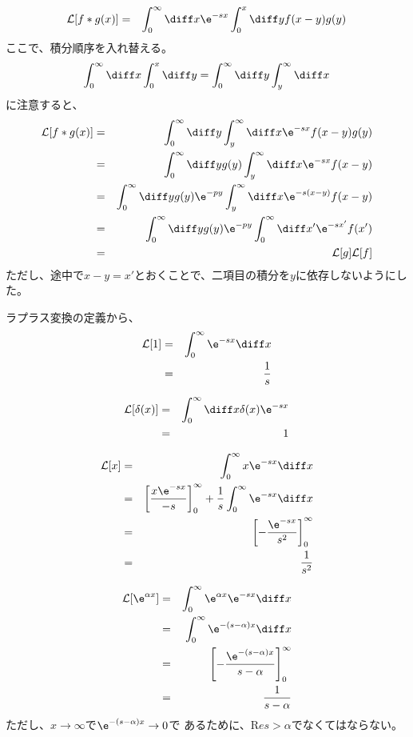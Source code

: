 \begin{eqnarray}
  {\cal L}[f*g(x)] &=&  \int_{0}^{\infty} \diff x \e^{-sx} \int_{0}^{x} \diff y f(x-y)g(y)
\end{eqnarray}
ここで、積分順序を入れ替える。
\begin{equation}
  \int_0^{\infty} \diff x \int_0^{x} \diff y = \int_0^{\infty} \diff y \int_y^{\infty} \diff x
\end{equation}
に注意すると、
\begin{eqnarray}
  {\cal L}[f*g(x)] &=&  \int_0^{\infty} \diff y \int_y^{\infty} \diff x  \e^{-sx} f(x-y)g(y) \\
  &=& \int_0^{\infty} \diff y g(y) \int_y^{\infty} \diff x  \e^{-sx} f(x-y) \\
  &=& \int_0^{\infty} \diff y g(y) \e^{-py} \int_y^{\infty} \diff x  \e^{-s(x-y)} f(x-y) \\
  &=& \int_0^{\infty} \diff y g(y) \e^{-py} \int_0^{\infty} \diff x'  \e^{-sx'} f(x') \\
  &=& {\cal L}[g] {\cal L}[f]
\end{eqnarray}
ただし、途中で$x-y = x'$とおくことで、二項目の積分を$y$に依存しないようにした。


ラプラス変換の定義から、
\begin{eqnarray}
  {\cal L}[1] &=& \int_0^{\infty} \e^{-sx} \diff x\\
  &=& \frac{1}{s}
\end{eqnarray}

\begin{eqnarray}
  {\cal L}[\delta(x)] &=& \int_0^{\infty} \diff x \delta(x) \e^{-sx}\\
  &=& 1
\end{eqnarray}

\begin{eqnarray}
  {\cal L}[x] &=& \int_0^{\infty}  x \e^{-sx} \diff x\\
  &=& \left[ \frac{x \e^{-sx}}{-s} \right]_0^{\infty} + \frac{1}{s} \int_0^{\infty} \e^{-sx} \diff x\\
  &=& \left[ -\frac{\e^{-sx}}{s^2} \right]_0^{\infty} \\
  &=& \frac{1}{s^2}
\end{eqnarray}

\begin{eqnarray}
  {\cal L}[\e^{\alpha x}] &=& \int_0^{\infty}  \e^{\alpha x} \e^{-sx} \diff x\\
  &=& \int_0^{\infty}  \e^{-(s-\alpha)x} \diff x\\
  &=& \left[ - \frac{\e^{-(s-\alpha)x}}{s-\alpha}  \right]_0^{\infty}\\
  &=& \frac{1}{s-\alpha}
\end{eqnarray}
ただし、$x \rightarrow \infty$で$\e^{-(s-\alpha)x} \rightarrow 0$で
あるために、${\mathrm Re} s > \alpha$でなくてはならない。

